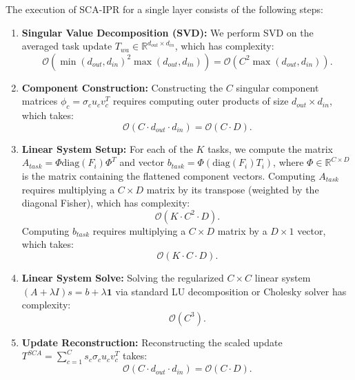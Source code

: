 \documentclass{article}
\theoremstyle{plain}
\theoremstyle{definition}
\theoremstyle{remark}
\begin{document}
The execution of SCA-IPR for a single layer consists of the following steps:
\begin{enumerate}
    \item \textbf{Singular Value Decomposition (SVD):} We perform SVD on the averaged task update $T_{wa} \in \mathbb{R}^{d_{out} \times d_{in}}$, which has complexity:
    \begin{equation}
        \mathcal{O}(\min(d_{out}, d_{in})^2 \max(d_{out}, d_{in})) = \mathcal{O}(C^2 \max(d_{out}, d_{in})).
    \end{equation}
    \item \textbf{Component Construction:} Constructing the $C$ singular component matrices $\phi_c = \sigma_c u_c v_c^T$ requires computing outer products of size $d_{out} \times d_{in}$, which takes:
    \begin{equation}
        \mathcal{O}(C \cdot d_{out} \cdot d_{in}) = \mathcal{O}(C \cdot D).
    \end{equation}
    \item \textbf{Linear System Setup:} 
    For each of the $K$ tasks, we compute the matrix $A_{task} = \Phi \text{diag}(F_i) \Phi^T$ and vector $b_{task} = \Phi \left( \text{diag}(F_i) T_i \right)$, where $\Phi \in \mathbb{R}^{C \times D}$ is the matrix containing the flattened component vectors.
    Computing $A_{task}$ requires multiplying a $C \times D$ matrix by its transpose (weighted by the diagonal Fisher), which has complexity:
    \begin{equation}
        \mathcal{O}(K \cdot C^2 \cdot D).
    \end{equation}
    Computing $b_{task}$ requires multiplying a $C \times D$ matrix by a $D \times 1$ vector, which takes:
    \begin{equation}
        \mathcal{O}(K \cdot C \cdot D).
    \end{equation}
    \item \textbf{Linear System Solve:} Solving the regularized $C \times C$ linear system $(A + \lambda I) s = b + \lambda \mathbf{1}$ via standard LU decomposition or Cholesky solver has complexity:
    \begin{equation}
        \mathcal{O}(C^3).
    \end{equation}
    \item \textbf{Update Reconstruction:} Reconstructing the scaled update $T^{SCA} = \sum_{c=1}^C s_c \sigma_c u_c v_c^T$ takes:
    \begin{equation}
        \mathcal{O}(C \cdot d_{out} \cdot d_{in}) = \mathcal{O}(C \cdot D).
    \end{equation}
\end{enumerate}
\end{document}
